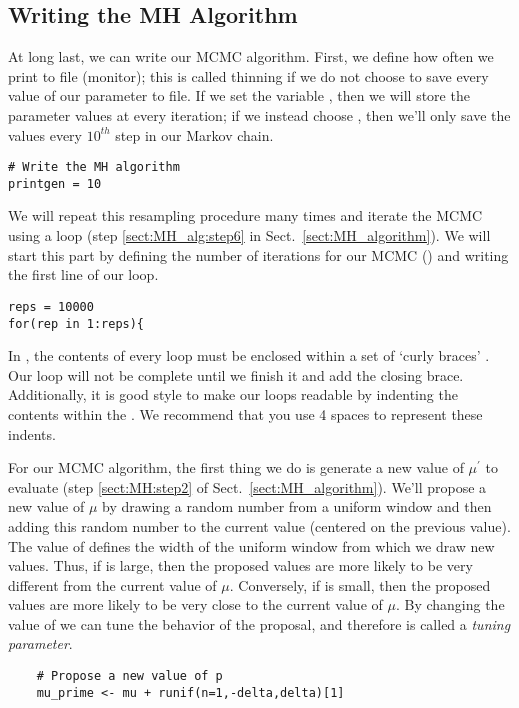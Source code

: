 \subsection{Writing the MH Algorithm}
At long last, we can write our MCMC algorithm.
First, we define how often we print to file (\IE monitor); this is called thinning if we do not choose to save every value of our parameter to file.
If we set the variable , then we will store the parameter values at every iteration; if we instead choose , then we'll only save the values every $10^{th}$ step in our Markov chain.
{\tt \begin{snugshade*}
\begin{lstlisting}
# Write the MH algorithm    
printgen = 10
\end{lstlisting}
\end{snugshade*}}
We will repeat this resampling procedure many times and iterate the MCMC using a  loop (\EG step \ref{sect:MH_alg:step6} in Sect.\ \ref{sect:MH_algorithm}). 
We will start this part by defining the number of iterations for our MCMC () and writing the first line of our  loop. 
{\tt \begin{snugshade*}
\begin{lstlisting}
reps = 10000 
for(rep in 1:reps){
\end{lstlisting}
\end{snugshade*}}
In \Rev, the contents of every  loop must be enclosed within a set of  `curly braces' . Our loop will not be complete until we finish it and add the closing brace. 
Additionally, it is good style to make our loops readable by indenting the contents within the . 
We recommend that you use 4 spaces to represent these indents.

For our MCMC algorithm, the first thing we do is generate a new value of $\mu^\prime$ to evaluate (step \ref{sect:MH:step2} of Sect.\ \ref{sect:MH_algorithm}).
We'll propose a new value of $\mu$ by drawing a random number from a uniform window and then adding this random number to the current value (\IE centered on the previous value).
The value of  defines the width of the uniform window from which we draw new values.
Thus, if  is large, then the proposed values are more likely to be very different from the current value of $\mu$.
Conversely, if  is small, then the proposed values are more likely to be very close to the current value of $\mu$.
By changing the value of  we can tune the behavior of the proposal, and therefore  is called a \emph{tuning parameter}.
{\tt \begin{snugshade*}
\begin{lstlisting}    
    # Propose a new value of p
    mu_prime <- mu + runif(n=1,-delta,delta)[1]
\end{lstlisting}
\end{snugshade*}}

